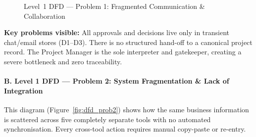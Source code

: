 \documentclass[12pt,a4paper]{report}
\begin{document}
\begin{figure}[H]
{
}
\caption{Level~1 DFD — Problem 1: Fragmented Communication \& Collaboration}
\label{fig:dfd_prob1}
\end{figure}

\begin{problemBox}
\textbf{Key problems visible:} All approvals and decisions live only in transient chat/email stores (D1–D3). There is no structured hand-off to a canonical project record. The Project Manager is the sole interpreter and gatekeeper, creating a severe bottleneck and zero traceability.
\end{problemBox}

\paragraph{B. Level 1 DFD — Problem 2: System Fragmentation \& Lack of Integration}

This diagram (Figure~\ref{fig:dfd_prob2}) shows how the same business information is scattered across five completely separate tools with no automated synchronisation. Every cross-tool action requires manual copy-paste or re-entry.
\end{document}
